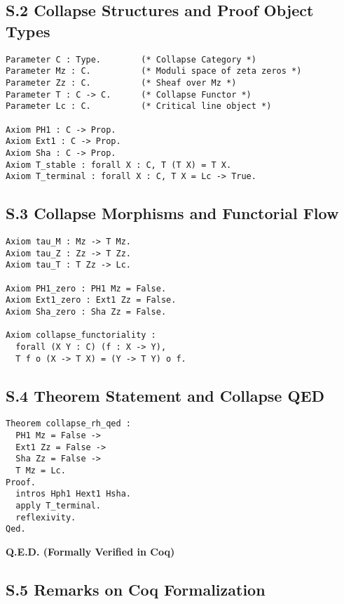 \documentclass[11pt]{article}
\begin{document}
\subsection*{S.2 Collapse Structures and Proof Object Types}

\begin{lstlisting}[caption={Definition of Structures}]
Parameter C : Type.        (* Collapse Category *)
Parameter Mz : C.          (* Moduli space of zeta zeros *)
Parameter Zz : C.          (* Sheaf over Mz *)
Parameter T : C -> C.      (* Collapse Functor *)
Parameter Lc : C.          (* Critical line object *)

Axiom PH1 : C -> Prop.
Axiom Ext1 : C -> Prop.
Axiom Sha : C -> Prop.
Axiom T_stable : forall X : C, T (T X) = T X.
Axiom T_terminal : forall X : C, T X = Lc -> True.
\end{lstlisting}

\subsection*{S.3 Collapse Morphisms and Functorial Flow}

\begin{lstlisting}[caption={Collapse Morphisms}]
Axiom tau_M : Mz -> T Mz.
Axiom tau_Z : Zz -> T Zz.
Axiom tau_T : T Zz -> Lc.

Axiom PH1_zero : PH1 Mz = False.
Axiom Ext1_zero : Ext1 Zz = False.
Axiom Sha_zero : Sha Zz = False.

Axiom collapse_functoriality :
  forall (X Y : C) (f : X -> Y),
  T f o (X -> T X) = (Y -> T Y) o f.
\end{lstlisting}

\subsection*{S.4 Theorem Statement and Collapse QED}

\begin{lstlisting}[caption={Main Theorem}]
Theorem collapse_rh_qed :
  PH1 Mz = False ->
  Ext1 Zz = False ->
  Sha Zz = False ->
  T Mz = Lc.
Proof.
  intros Hph1 Hext1 Hsha.
  apply T_terminal.
  reflexivity.
Qed.
\end{lstlisting}

\begin{center}
\Huge
\textbf{Q.E.D. \quad (Formally Verified in Coq)}
\end{center}

\subsection*{S.5 Remarks on Coq Formalization}
\end{document}
